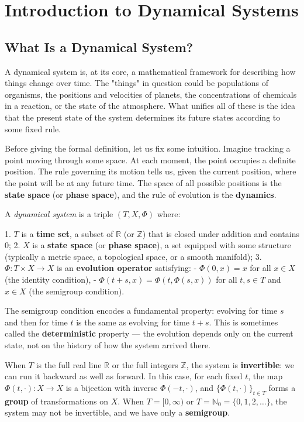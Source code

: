 \chapter{Introduction to Dynamical Systems}\label{ch:1}

\section{What Is a Dynamical System?}\label{sec:1.1}

A dynamical system is, at its core, a mathematical framework for describing how things change over time. The "things" in question could be populations of organisms, the positions and velocities of planets, the concentrations of chemicals in a reaction, or the state of the atmosphere. What unifies all of these is the idea that the present state of the system determines its future states according to some fixed rule.

Before giving the formal definition, let us fix some intuition. Imagine tracking a point moving through some space. At each moment, the point occupies a definite position. The rule governing its motion tells us, given the current position, where the point will be at any future time. The space of all possible positions is the \textbf{state space} (or \textbf{phase space}), and the rule of evolution is the \textbf{dynamics}.

\begin{definition}\label{def:1.1}
A \textit{dynamical system} is a triple $(T, X, \Phi)$ where:

1. $T$ is a \textbf{time set}, a subset of $\mathbb{R}$ (or $\mathbb{Z}$) that is closed under addition and contains $0$;
2. $X$ is a \textbf{state space} (or \textbf{phase space}), a set equipped with some structure (typically a metric space, a topological space, or a smooth manifold);
3. $\Phi: T \times X \to X$ is an \textbf{evolution operator} satisfying:
   - $\Phi(0, x) = x$ for all $x \in X$ (the identity condition),
   - $\Phi(t + s, x) = \Phi(t, \Phi(s, x))$ for all $t, s \in T$ and $x \in X$ (the semigroup condition).

The semigroup condition encodes a fundamental property: evolving for time $s$ and then for time $t$ is the same as evolving for time $t + s$. This is sometimes called the \textbf{deterministic} property --- the evolution depends only on the current state, not on the history of how the system arrived there.

When $T$ is the full real line $\mathbb{R}$ or the full integers $\mathbb{Z}$, the system is \textbf{invertible}: we can run it backward as well as forward. In this case, for each fixed $t$, the map $\Phi(t, \cdot): X \to X$ is a bijection with inverse $\Phi(-t, \cdot)$, and $\{\Phi(t, \cdot)\}_{t \in T}$ forms a \textbf{group} of transformations on $X$. When $T = [0, \infty)$ or $T = \mathbb{N}_0 = \{0, 1, 2, \ldots\}$, the system may not be invertible, and we have only a \textbf{semigroup}.
\end{definition}


